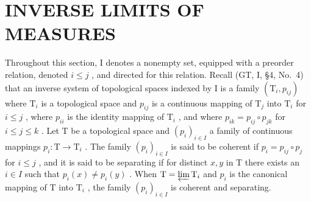 \section{INVERSE LIMITS OF MEASURES}

Throughout this section, I denotes a nonempty set, equipped with a preorder relation, denoted \(i \leqslant j\) , and directed for this relation. Recall (GT, I, §4, No.~4) that an inverse system of topological spaces indexed by I is a family \((\mathrm{T}_i, p_{ij})\) where \(\mathrm{T}_i\) is a topological space and \(p_{ij}\) is a continuous mapping of \(\mathrm{T}_j\) into \(\mathrm{T}_i\) for \(i \leqslant j\) , where \(p_{ii}\) is the identity mapping of \(\mathrm{T}_i\) , and where \(p_{ik} = p_{ij} \circ p_{jk}\) for \(i \leqslant j \leqslant k\) . Let T be a topological space and \((p_i)_{i \in I}\) a family of continuous mappings \(p_i: \mathrm{T} \to \mathrm{T}_i\) . The family \((p_i)_{i \in I}\) is said to be coherent if \(p_i = p_{ij} \circ p_j\) for \(i \leqslant j\) , and it is said to be separating if for distinct \(x, y\) in T there exists an \(i \in I\) such that \(p_i(x) \neq p_i(y)\) . When \(\mathrm{T} = \varprojlim \mathrm{T}_i\) and \(p_i\) is the canonical mapping of T into \(\mathrm{T}_i\) , the family \((p_i)_{i \in I}\) is coherent and separating.

